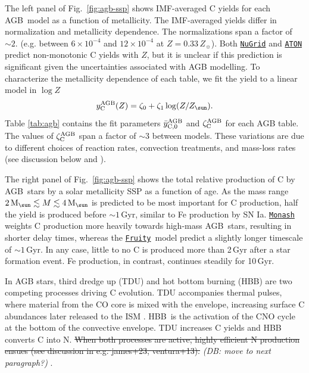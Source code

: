 \documentclass[fleqn,
usenatbib]{mnras}
\makeatletter
\newcommand{\JJ}{\citetalias{james+21}}
\newcommand{\fruity}{\texttt{\hyperlink{fruity}{Fruity}}}
\newcommand{\nugrid}{\texttt{\hyperlink{nugrid}{NuGrid}}}
\newcommand{\monash}{\texttt{\hyperlink{monash}{Monash}}}
\newcommand{\aton}{\texttt{\hyperlink{aton}{ATON}}}
\newcommand{\agb}{AGB}
\newcommand{\ia}{SN Ia}
\newcommand{\C}[1][\@nil]{
    \def\tmp{#1}%
    \ifx\tmp\@nnil%
        \ensuremath{\rm C}%
    \else%
        \ifmmode ^{#1}{\rm C}%
        \else $^{#1}$C%
        \fi%
\fi }
\newcommand{\zagb}{\zeta_{\rm C}^{\rm AGB}}
\newcommand{\zetao}{\zeta_0}
\newcommand{\zetai}{\zeta_{1}}
\newcommand{\Mo}{ {\rm M}_{\sun}}
\newcommand{\Zo}{ Z_{\sun}}
\newcommand{\about}[1]{${\sim} #1$}
\newcommand{\dbstrike}[1]{{\color{Thistle} \sout{#1} }}
\newcommand{\dbnote}[1]{ {\color{Thistle} \textit{\small (DB: #1)}} }
\makeatother
\begin{document}
The left panel of Fig.~\ref{fig:agb-ssp} shows IMF-averaged C yields for each \agb\ model as a function of metallicity.
The IMF-averaged yields differ in normalization and metallicity dependence.  
The normalizations span a factor of \about{2}. (e.g. between $6\times 10^{-4}$ and $12 \times 10^{-4}$ at $Z=0.33\,\Zo$).
Both \nugrid{} and \aton{} predict non-monotonic C yields with $Z$, but it is unclear if this prediction is significant given the uncertainties associated with AGB modelling.
To characterize the metallicity dependence of each table, we fit the yield to a linear model in $\log Z$
\begin{equation}\label{eq:agb_z_approx}
    y_{\rm C}^{\rm AGB}(Z) = \zetao + \zetai \log(Z / \Zo).
\end{equation}
Table \ref{tab:agb} contains the fit parameters $\bar y_{\rm C, 0}^{\rm AGB}$ and $\zagb$ for each AGB table.
The values of $\zagb$ span a factor of $\sim{3}$ between models.
These variations are due to different choices of reaction rates, convection treatments, and mass-loss rates (see discussion below and \JJ). 



The right panel of Fig.~\ref{fig:agb-ssp} shows the total relative production of C by \agb\ stars by a solar metallicity SSP as a function of age.
As the mass range $2\,\Mo\lesssim M \lesssim 4\,\Mo$ is predicted to be most important for C production, half the yield is produced before \about{1}\,Gyr, similar to Fe production by \ia. 
\monash{} weights C production more heavily towards high-mass \agb\ stars, resulting in shorter delay times, whereas the \fruity\ model predict a slightly longer timescale of \about{1}\,Gyr. In any case, little to no C is produced more than 2\,Gyr after a star formation event. Fe production, in contrast, continues steadily for 10\,Gyr. 

In AGB stars, {third dredge up} (TDU) and {hot bottom burning} (HBB) are two competing processes driving C evolution.
TDU accompanies thermal pulses, where material from the CO core is mixed with the envelope, increasing surface C abundances 
later released to the ISM \citep{KL14}.  
HBB\ is the activation of the CNO cycle at the bottom of the convective envelope.
TDU increases C yields and HBB converts C into N. \dbstrike{When both processes are active, highly efficient N production ensues (see discussion in e.g. {james+23, ventura+13}).} \dbnote{move to next paragraph?}.
\end{document}
